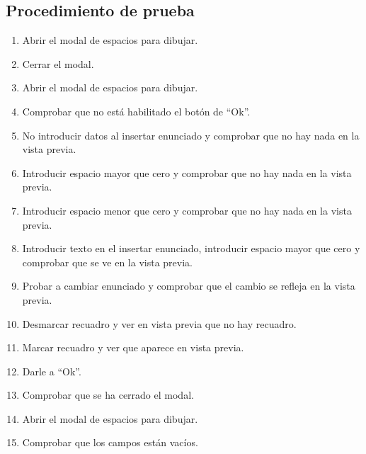 \subsection{Procedimiento de prueba}
\label{procedimientoPruebas:dibujar}
\begin{enumerate}
    \item Abrir el modal de espacios para dibujar.
    \item Cerrar el modal.
    \item Abrir el modal de espacios para dibujar.
    \item Comprobar que no está habilitado el botón de ``Ok''.
    \item No introducir datos al insertar enunciado y comprobar que no hay nada en la vista previa. 
    \item Introducir espacio mayor que cero y comprobar que no hay nada en la vista previa.
    \item Introducir espacio menor que cero y comprobar que no hay nada en la vista previa.
    \item Introducir texto en el insertar enunciado, introducir espacio  mayor que cero y comprobar que se ve en la vista previa. 
    \item Probar a cambiar enunciado y comprobar que el cambio se refleja en la vista previa.
    \item Desmarcar recuadro y ver en vista previa que no hay recuadro.
    \item Marcar recuadro y ver que aparece en vista previa.
    \item Darle a ``Ok''.
    \item Comprobar que se ha cerrado el modal.
    \item Abrir el modal de  espacios para dibujar.
    \item Comprobar que los campos están vacíos. 
\end{enumerate}